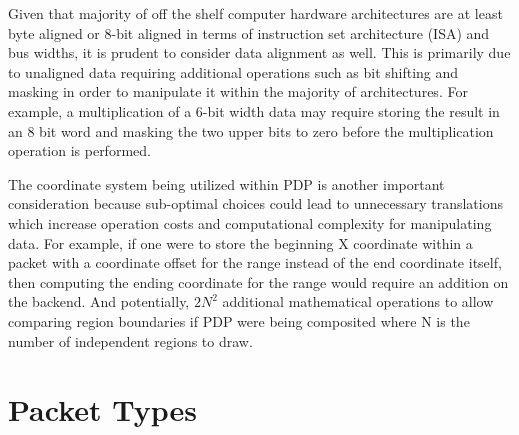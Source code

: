     Given that majority of off the shelf computer hardware architectures are at least byte aligned or 8-bit aligned in terms of instruction set architecture (ISA) and bus widths, it is prudent to consider data alignment as well. This is primarily due to unaligned data requiring additional operations such as bit shifting and masking in order to manipulate it within the majority of architectures. For example, a multiplication of a 6-bit width data may require storing the result in an 8 bit word and masking the two upper bits to zero before the multiplication operation is performed.

    The coordinate system being utilized within PDP is another important consideration because sub-optimal choices could lead to unnecessary translations which increase operation costs and computational complexity for manipulating data. For example, if one were to store the beginning X coordinate within a packet with a coordinate offset for the range instead of the end coordinate itself, then computing the ending coordinate for the range would require an addition on the backend. And potentially, $2N^2$ additional mathematical operations to allow comparing region boundaries if PDP were being composited where N is the number of independent regions to draw.



\section{Packet Types}
    \label{sec:packet_types}

